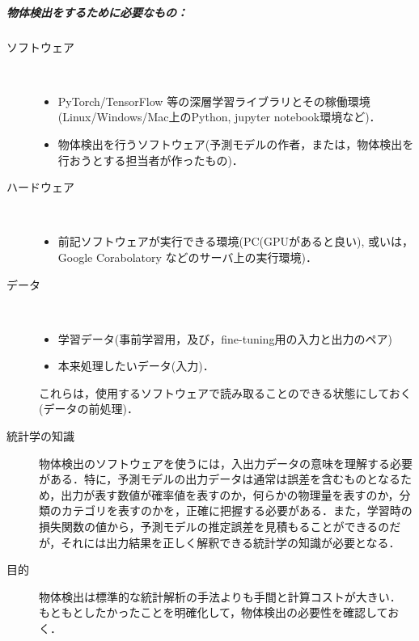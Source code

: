\documentclass[twocolumn]{jsarticle} %
\begin{document}
\subparagraph{物体検出をするために必要なもの：}
\begin{description}
    \item[ソフトウェア]　
    \begin{itemize}
        \item PyTorch/TensorFlow 等の深層学習ライブラリとその稼働環境(Linux/Windows/Mac上のPython, jupyter notebook環境など)．
        \item 物体検出を行うソフトウェア(予測モデルの作者，または，物体検出を行おうとする担当者が作ったもの)．
    \end{itemize}
    \item[ハードウェア]　
    \begin{itemize}
        \item 前記ソフトウェアが実行できる環境(PC(GPUがあると良い), 或いは，Google Corabolatory などのサーバ上の実行環境)．
    \end{itemize}
    \item[データ]　
    \begin{itemize}
        \item 学習データ(事前学習用，及び，fine-tuning用の入力と出力のペア)
        \item 本来処理したいデータ(入力)．
    \end{itemize}
    これらは，使用するソフトウェアで読み取ることのできる状態にしておく(データの前処理)．

    \item[統計学の知識] 物体検出のソフトウェアを使うには，入出力データの意味を理解する必要がある．特に，予測モデルの出力データは通常は誤差を含むものとなるため，出力が表す数値が確率値を表すのか，何らかの物理量を表すのか，分類のカテゴリを表すのかを，正確に把握する必要がある．また，学習時の損失関数の値から，予測モデルの推定誤差を見積もることができるのだが，それには出力結果を正しく解釈できる統計学の知識が必要となる．

    \item[目的] 
    物体検出は標準的な統計解析の手法よりも手間と計算コストが大きい．
    もともとしたかったことを明確化して，物体検出の必要性を確認しておく．
\end{description}

\end{document}
